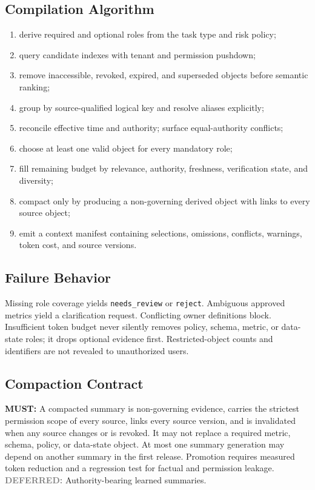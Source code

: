 \documentclass[10pt]{article}
\newcommand{\code}[1]{\texttt{#1}}
\newcommand{\must}{\textbf{\textcolor{amosblue}{MUST:}}\xspace}
\newcommand{\deferred}{\textbf{\textcolor{gray}{DEFERRED:}}\xspace}
\begin{document}
\subsection{Compilation Algorithm}

\begin{enumerate}
  \item derive required and optional roles from the task type and risk policy;
  \item query candidate indexes with tenant and permission pushdown;
  \item remove inaccessible, revoked, expired, and superseded objects before semantic ranking;
  \item group by source-qualified logical key and resolve aliases explicitly;
  \item reconcile effective time and authority; surface equal-authority conflicts;
  \item choose at least one valid object for every mandatory role;
  \item fill remaining budget by relevance, authority, freshness, verification state, and diversity;
  \item compact only by producing a non-governing derived object with links to every source object;
  \item emit a context manifest containing selections, omissions, conflicts, warnings, token cost, and source versions.
\end{enumerate}

\subsection{Failure Behavior}

Missing role coverage yields \code{needs\_review} or \code{reject}. Ambiguous approved metrics yield a clarification request. Conflicting owner definitions block. Insufficient token budget never silently removes policy, schema, metric, or data-state roles; it drops optional evidence first. Restricted-object counts and identifiers are not revealed to unauthorized users.

\subsection{Compaction Contract}

\must A compacted summary is non-governing evidence, carries the strictest permission scope of every source, links every source version, and is invalidated when any source changes or is revoked. It may not replace a required metric, schema, policy, or data-state object. At most one summary generation may depend on another summary in the first release. Promotion requires measured token reduction and a regression test for factual and permission leakage. \deferred Authority-bearing learned summaries.
\end{document}
